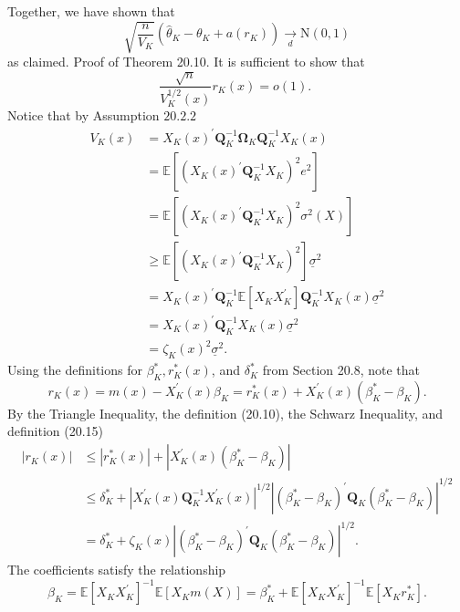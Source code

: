 \documentclass[10pt]{article}
\begin{document}
Together, we have shown that
$$
\sqrt{\frac{n}{V_{K}}}\left(\widehat{\theta}_{K}-\theta_{K}+a\left(r_{K}\right)\right) \underset{d}{\longrightarrow} \mathrm{N}(0,1)
$$
as claimed. Proof of Theorem 20.10. It is sufficient to show that
$$
\frac{\sqrt{n}}{V_{K}^{1 / 2}(x)} r_{K}(x)=o(1) \text {. }
$$
Notice that by Assumption $20.2 .2$
$$
\begin{aligned}
V_{K}(x) &=X_{K}(x)^{\prime} \boldsymbol{Q}_{K}^{-1} \boldsymbol{\Omega}_{K} \boldsymbol{Q}_{K}^{-1} X_{K}(x) \\
&=\mathbb{E}\left[\left(X_{K}(x)^{\prime} \boldsymbol{Q}_{K}^{-1} X_{K}\right)^{2} e^{2}\right] \\
&=\mathbb{E}\left[\left(X_{K}(x)^{\prime} \boldsymbol{Q}_{K}^{-1} X_{K}\right)^{2} \sigma^{2}(X)\right] \\
& \geq \mathbb{E}\left[\left(X_{K}(x)^{\prime} \boldsymbol{Q}_{K}^{-1} X_{K}\right)^{2}\right] \underline{\sigma}^{2} \\
&=X_{K}(x)^{\prime} \boldsymbol{Q}_{K}^{-1} \mathbb{E}\left[X_{K} X_{K}^{\prime}\right] \boldsymbol{Q}_{K}^{-1} X_{K}(x) \underline{\sigma}^{2} \\
&=X_{K}(x)^{\prime} \boldsymbol{Q}_{K}^{-1} X_{K}(x) \underline{\sigma}^{2} \\
&=\zeta_{K}(x)^{2} \underline{\sigma}^{2} .
\end{aligned}
$$
Using the definitions for $\beta_{K}^{*}, r_{K}^{*}(x)$, and $\delta_{K}^{*}$ from Section 20.8, note that
$$
r_{K}(x)=m(x)-X_{K}^{\prime}(x) \beta_{K}=r_{K}^{*}(x)+X_{K}^{\prime}(x)\left(\beta_{K}^{*}-\beta_{K}\right) .
$$
By the Triangle Inequality, the definition (20.10), the Schwarz Inequality, and definition (20.15)
$$
\begin{aligned}
\left|r_{K}(x)\right| & \leq\left|r_{K}^{*}(x)\right|+\left|X_{K}^{\prime}(x)\left(\beta_{K}^{*}-\beta_{K}\right)\right| \\
& \leq \delta_{K}^{*}+\left|X_{K}^{\prime}(x) \boldsymbol{Q}_{K}^{-1} X_{K}^{\prime}(x)\right|^{1 / 2}\left|\left(\beta_{K}^{*}-\beta_{K}\right)^{\prime} \boldsymbol{Q}_{K}\left(\beta_{K}^{*}-\beta_{K}\right)\right|^{1 / 2} \\
&=\delta_{K}^{*}+\zeta_{K}(x)\left|\left(\beta_{K}^{*}-\beta_{K}\right)^{\prime} \boldsymbol{Q}_{K}\left(\beta_{K}^{*}-\beta_{K}\right)\right|^{1 / 2} .
\end{aligned}
$$
The coefficients satisfy the relationship
$$
\beta_{K}=\mathbb{E}\left[X_{K} X_{K}^{\prime}\right]^{-1} \mathbb{E}\left[X_{K} m(X)\right]=\beta_{K}^{*}+\mathbb{E}\left[X_{K} X_{K}^{\prime}\right]^{-1} \mathbb{E}\left[X_{K} r_{K}^{*}\right] .
$$
\end{document}

